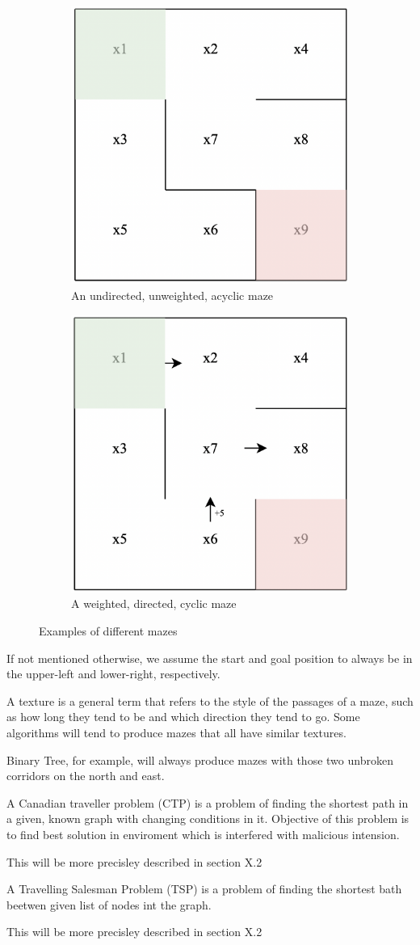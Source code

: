  \begin{figure}
	\centering
	\begin{subfigure}{.5\textwidth}
	  \centering
	  \includegraphics[width=.4\linewidth]{undirected_maze}
	  \caption{An undirected, unweighted, acyclic maze}
	  \label{fig:sub1}
	\end{subfigure}%
	\begin{subfigure}{.5\textwidth}
	  \centering
	  \includegraphics[width=.4\linewidth]{cyclic_maze}
	  \caption{A weighted, directed, cyclic maze}
	  \label{fig:sub2}
	\end{subfigure}
	\caption{Examples of different mazes}
	\label{fig:test}
	\end{figure}
	If not mentioned otherwise, we assume the start and goal position to always be in the upper-left and lower-right, respectively.
 \begin{definition}
A texture is a general term that refers to the style of the passages of a maze, such as how long they tend to be and which direction they tend to go. Some algorithms will tend to produce mazes that all have similar textures.\cite{mazes}
 \end{definition}
 Binary Tree, for example, will always produce mazes with those two unbroken corridors on the north and east.
\begin{definition}
A Canadian traveller problem (CTP) is a problem of finding the shortest path in a given, known graph with changing conditions in it. Objective of this problem is to find best solution in enviroment which is interfered with malicious intension.
\end{definition}
This will be more precisley described in section X.2
\begin{definition}
A Travelling Salesman Problem (TSP) is a problem of finding the shortest bath beetwen given list of nodes int the graph. 
\end{definition}
This will be more precisley described in section X.2
